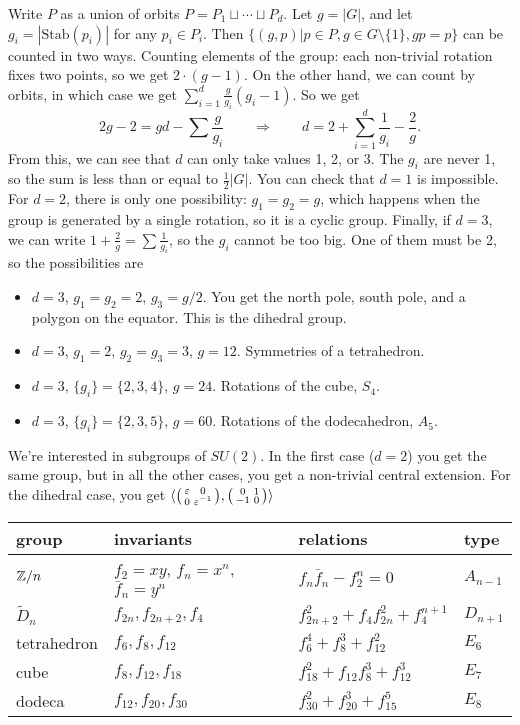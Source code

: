 Write $P$ as a union of orbits $P=P_1\sqcup \cdots \sqcup P_d$. Let $g=|G|$, and let $g_i=|\mathrm{Stab}(p_i)|$ for any $p_i\in P_i$. Then $\{(g,p)|p\in P,g\in G\setminus \{1\}, gp=p\}$ can be counted in two ways. Counting elements of the group: each non-trivial rotation fixes two points, so we get $2\cdot (g-1)$. On the other hand, we can count by orbits, in which case we get $\sum_{i=1}^d \frac{g}{g_i}(g_i-1)$. So we get
\[
 2g-2 = gd-\sum \frac{g}{g_i} \qquad\Rightarrow\qquad d=2+\sum_{i=1}^d \frac{1}{g_i}-\frac 2g.
\]
From this, we can see that $d$ can only take values 1, 2, or 3. The $g_i$ are never 1, so the sum is less than or equal to $\frac 12 |G|$. You can check that $d=1$ is impossible. For $d=2$, there is only one possibility: $g_1=g_2=g$, which happens when the group is generated by a single rotation, so it is a cyclic group. Finally, if $d=3$, we can write $1+\frac 2g = \sum \frac 1{g_i}$, so the $g_i$ cannot be too big. One of them must be 2, so the possibilities are
\begin{itemize}
 \item $d=3$, $g_1=g_2=2$, $g_3=g/2$. You get the north pole, south pole, and a polygon on the equator. This is the dihedral group.
 \item $d=3$, $g_1=2$, $g_2=g_3=3$, $g=12$. Symmetries of a tetrahedron.
 \item $d=3$, $\{g_i\}=\{2,3,4\}$, $g=24$. Rotations of the cube, $S_4$.
 \item $d=3$, $\{g_i\}=\{2,3,5\}$, $g=60$. Rotations of the dodecahedron, $A_5$.
\end{itemize}

We're interested in subgroups of $SU(2)$. In the first case ($d=2$) you get the same group, but in all the other cases, you get a non-trivial central extension. For the dihedral case, you get $\langle \bigl(\begin{smallmatrix} \varepsilon&0\\ 0&\varepsilon^{-1} \end{smallmatrix}\bigr), \bigl(\begin{smallmatrix} 0&1\\ -1&0 \end{smallmatrix}\bigr)\rangle$

\begin{tabular}{l|lll}
 group & invariants & relations & type \\ \hline
 \rule{0pt}{1em}$\mathbb{Z}/n$ & $f_2=xy$, $f_n=x^n$, $\bar f_n=y^n$ & $f_n\bar f_n-f_2^n=0$ & $A_{n-1}$\\
 $\tilde D_n$ & $f_{2n},f_{2n+2}, f_4$ & $f_{2n+2}^2+f_4f_{2n}^2+f_4^{n+1}$ & $D_{n+1}$ \\
 tetrahedron& $f_6, f_8, f_{12}$ & $f_6^4+f_8^3+f_{12}^2$ & $E_6$\\
 cube & $f_8,f_{12},f_{18}$ & $f_{18}^2+f_{12}f_8^3+f_{12}^3$ & $E_7$\\
 dodeca & $f_{12},f_{20},f_{30}$ & $f_{30}^2+f_{20}^3+f_{15}^5$ & $E_8$
\end{tabular}

